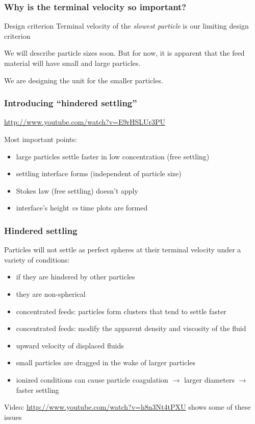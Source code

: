 \begin{frame}\frametitle{Why is the terminal velocity so important?}
	\begin{exampleblock}{Design criterion}
		Terminal velocity of the \emph{slowest particle} is our limiting design criterion
	\end{exampleblock}
	
	\vspace{12pt}
	We will describe particle sizes soon. But for now, it is apparent that the feed material will have small and large particles.
	
	\vspace{12pt}
	We are designing the unit for the smaller particles.
\end{frame}

\begin{frame}\frametitle{Introducing ``hindered settling''}
	\href{http://www.youtube.com/watch?v=E9rHSLUr3PU}{http://www.youtube.com/watch?v=E9rHSLUr3PU}
	
	\vspace{12pt}
	Most important points:
	\begin{itemize}
		\item	large particles settle faster in low concentration (free settling)
		\item	settling interface forms (independent of particle size)
		\item	Stokes law (free settling) doesn't apply
		\item	interface's height \emph{vs} time plots are formed
	\end{itemize}
\end{frame}


\begin{frame}\frametitle{{\color{purple}Hindered settling}}
	Particles will not settle as perfect spheres at their terminal velocity under a variety of conditions:
	\begin{itemize}
		\item	if they are hindered by other particles
		\item	they are non-spherical
		\item	concentrated feeds: particles form clusters that tend to settle faster
		\item	concentrated feeds: modify the apparent density and viscosity of the fluid
		\item	upward velocity of displaced fluids
		\item	small particles are dragged in the wake of larger particles
		\item	ionized conditions can cause particle coagulation $\rightarrow$ larger diameters $\rightarrow$ faster settling
	\end{itemize}

	\vspace{12pt}
	Video: \href{http://www.youtube.com/watch?v=h8n3Nt4tPXU}{http://www.youtube.com/watch?v=h8n3Nt4tPXU} shows some of these issues

\end{frame}

